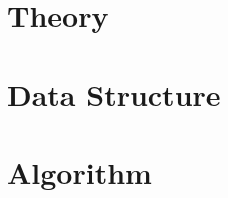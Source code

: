 \documentclass[a4paper,10pt]{book}
\begin{document}
\frontmatter{}

\cleardoublepage{}
\tableofcontents{}
\cleardoublepage{}
\listoffigures{}
\cleardoublepage{}
\listoftables{}


\mainmatter{}

\part{Theory}
\label{part:theory}




\part{Data Structure}
\label{part:data-structure}









\part{Algorithm}
\label{part:algorithm}




\backmatter{}
\cleardoublepage{}
\nocite{*}


\cleardoublepage{}
\printindex{}
\end{document}
